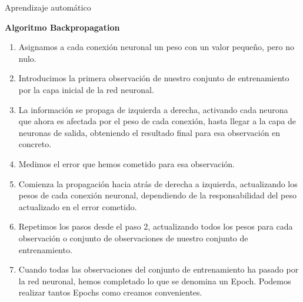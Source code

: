 \documentclass[
  ignorenonframetext,
]{beamer}
\begin{document}
\begin{frame}{Aprendizaje automático}
\protect\hypertarget{aprendizaje-automuxe1tico}{}

\begin{block}{\textbf{Algoritmo Backpropagation}}

\begin{enumerate}
\item
  Asignamos a cada conexión neuronal un peso con un valor pequeño, pero
  no nulo.
\item
  Introducimos la primera observación de nuestro conjunto de
  entrenamiento por la capa inicial de la red neuronal.
\item
  La información se propaga de izquierda a derecha, activando cada
  neurona que ahora es afectada por el peso de cada conexión, hasta
  llegar a la capa de neuronas de salida, obteniendo el resultado final
  para esa observación en concreto.
\item
  Medimos el error que hemos cometido para esa observación.
\item
  Comienza la propagación hacia atrás de derecha a izquierda,
  actualizando los pesos de cada conexión neuronal, dependiendo de la
  responsabilidad del peso actualizado en el error cometido.
\item
  Repetimos los pasos desde el paso 2, actualizando todos los pesos para
  cada observación o conjunto de observaciones de nuestro conjunto de
  entrenamiento.
\item
  Cuando todas las observaciones del conjunto de entrenamiento ha pasado
  por la red neuronal, hemos completado lo que se denomina un Epoch.
  Podemos realizar tantos Epochs como creamos convenientes.
\end{enumerate}

\end{block}

\end{frame}
\end{document}
